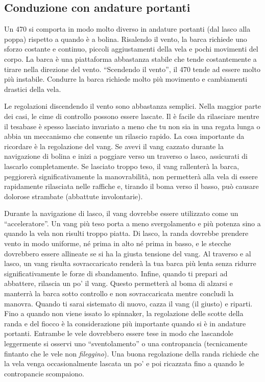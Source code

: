 
\subsection{Conduzione con andature portanti}
\label{sec:conduzione_andature_portanti}
Un 470 si comporta in modo molto diverso in andature portanti (dal lasco alla poppa)
rispetto a quando è a bolina. Risalendo il vento, la barca richiede uno sforzo
costante e continuo, piccoli aggiustamenti della vela e pochi movimenti
del corpo. La barca è una piattaforma abbastanza stabile che tende costantemente
a tirare nella direzione del vento. ``Scendendo il vento'', il 470 tende ad essere molto più instabile.
Condurre la barca richiede molto più movimento e cambiamenti drastici della
vela.

Le regolazioni discendendo il vento sono abbastanza semplici. Nella maggior parte
dei casi, le cime di controllo possono essere lascate. Il \cunningham è facile
da rilasciare mentre il tesabase è spesso lasciato invariato a meno che tu non sia in
una regata lunga o abbia un meccanismo che consente un rilascio rapido. La cosa importante da
ricordare è la regolazione del vang. Se avevi il vang cazzato durante la
navigazione di
bolina e inizi a poggiare verso un traverso o lasco, assicurati di lascarlo
completamente. Se lasciato troppo teso, il vang rallenterà la barca, peggiorerà significativamente la
manovrabilità, non permetterà alla vela di essere rapidamente rilasciata nelle
raffiche e, tirando il boma verso il basso, può causare dolorose strambate
(abbattute involontarie).

Durante la navigazione di lasco, il vang dovrebbe essere utilizzato come un
``acceleratore''. Un vang più teso porta a
meno svergolamento e più potenza sino a quando la vela non risulti troppo
piatta. Di lasco, la randa dovrebbe prendere vento in modo uniforme, né prima in
alto né prima in basso, e le stecche dovrebbero essere allineate se si ha la
giusta tensione del vang. Al traverso e al lasco, un vang risulta sovraccaricato renderà la tua barca più
lenta senza ridurre significativamente le forze di sbandamento. Infine, quando
ti prepari ad abbattere, rilascia un po' il vang. Questo permetterà al boma di
alzarsi e manterrà la barca sotto controllo e non sovraccaricata mentre concludi
la manovra. Quando ti sarai sistemato di nuovo, cazza il vang (il giusto) e
riparti. Fino a quando non viene issato lo spinnaker, la regolazione delle
scotte della randa e del fiocco è la considerazione più importante quando si è
in andature portanti. Entrambe le vele dovrebbero essere tese in modo che
lascandole leggermente si osservi uno ``sventolamento'' o una contropancia
(tecnicamente fintanto che le vele non \emph{fileggino}). Una
buona regolazione della randa richiede che la vela venga occasionalmente
lascata un po' e poi ricazzata fino a quando le contropancie scompaiono.

